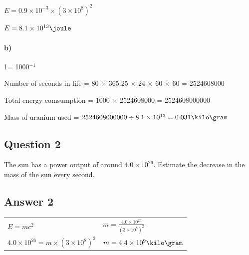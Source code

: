 \documentclass{article}
\begin{document}
$E = 0.9\times10^{-3} \times (3\times10^8)^2$

$E = 8.1\times10^{13}\joule$

\paragraph*{b)}
\setlength\parindent{20pt}

1\kilo\watt = 1000\joule\second$^{-1}$

Number of seconds in life = 80 $\times$ 365.25 $\times$ 24 $\times$  60 $\times$ 60 = 2524608000\second

Total energy comsumption = 1000 $\times$ 2524608000 = 2524608000000\joule

Mass of uranium used = $2524608000000 \div 8.1\times10^{13} = 0.031\kilo\gram$

\subsection*{Question 2}
\setlength\parindent{0pt}

The sun has a power output of around $4.0\times10^{26}$\watt. Estimate the
decrease in the mass of the sun every second.

\subsection*{Answer 2}

\begin{tabular}{p{} | p{}}

$E=mc^2$ & $m = \frac{4.0\times10^{26}}{(3\times10^8)^2}$\\

$4.0\times10^{26}=m\times(3\times10^8)^2$ & $m = 4.4\times10^9\kilo\gram$\\

\end{tabular}
\end{document}
